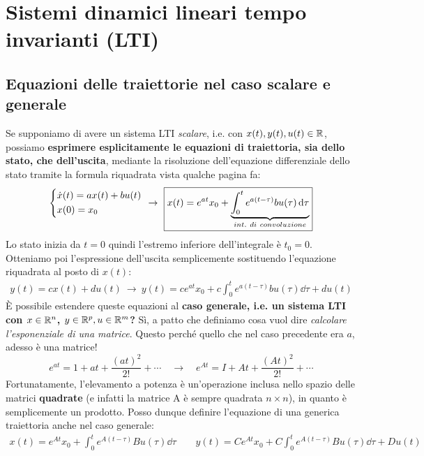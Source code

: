 \documentclass[a4paper]{report}
\begin{document}
\section{Sistemi dinamici lineari tempo invarianti (LTI)}

\subsection{Equazioni delle traiettorie nel caso scalare e generale}
\label{subsec:eq_traj_lti_scalare_gen}
Se supponiamo di avere un sistema LTI \textit{scalare}, i.e. con $x(t),y(t),u(t) \in \mathbb{R}$, possiamo \textbf{esprimere esplicitamente le equazioni di traiettoria, sia dello stato, che dell'uscita}, mediante la risoluzione dell'equazione differenziale dello stato tramite la formula riquadrata vista qualche pagina fa:
\begin{align*}
	\begin{dcases}
	\dot x(t) = ax(t) + bu(t) \\
	x(0) = x_0
	\end{dcases} \ \rightarrow \ \boxed{x(t) =e^{at}x_0+\underbrace{\int_0^te^{a(t-\tau)}bu(\tau)\dd{\tau}}_{int. \ di \ convoluzione}}
\end{align*}
Lo stato inizia da $t= 0$ quindi l'estremo inferiore dell'integrale è $t_0  = 0.$ Otteniamo poi l'espressione dell'uscita semplicemente sostituendo l'equazione riquadrata al posto di $x(t)$:
\begin{align*}
	y(t) = cx(t) +du(t) \ \rightarrow \ \boxed{y(t) = ce^{at}x_0+c\int_0^te^{a(t-\tau)}bu(\tau)\dd{\tau} + du(t)}
\end{align*}
\bb
È possibile estendere queste equazioni al \textbf{caso generale, i.e. un sistema LTI con $x \in \mathbb{R}^n$, $y \in \mathbb{R}^p, u \in \mathbb{R}^m$?} Sì, a patto che definiamo cosa vuol dire \textit{calcolare l'esponenziale di una matrice}. Questo perché quello che nel caso precedente era $a$, adesso è una matrice!
\begin{equation*}
	e^{at} = 1+at + \frac{(at)^2}{2!} + \cdots  \quad \longrightarrow \quad e^{At} = I+ At+\frac{(At)^2}{2!} + \cdots 
\end{equation*}
Fortunatamente, l'elevamento a potenza è un'operazione inclusa nello spazio delle matrici \textbf{quadrate} (e infatti la matrice A è sempre quadrata $n\times n$), in quanto è semplicemente un prodotto. Posso dunque definire l'equazione di una generica traiettoria anche nel caso generale:
\begin{align*}
	\boxed{x(t) =e^{At}x_0+\int_0^te^{A(t-\tau)}Bu(\tau)\dd{\tau} \quad \quad y(t) = Ce^{At}x_0+C\int_0^te^{A(t-\tau)}Bu(\tau)\dd{\tau}  + Du(t)}	
\end{align*}
\end{document}
